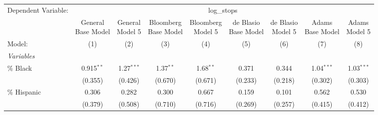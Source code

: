 \begingroup
\centering
\begin{tabular}{lcccccccc}
   \tabularnewline \midrule \midrule
   Dependent Variable: & \multicolumn{8}{c}{log\_stops}\\
                & \makecell{General\\ Base Model}    & \makecell{General\\ Model 5}    & \makecell{Bloomberg\\ Base Model}    & \makecell{Bloomberg\\ Model 5}    & \makecell{de Blasio\\ Base Model}    & \makecell{de Blasio\\ Model 5}    & \makecell{Adams\\ Base Model}    & \makecell{Adams\\ Model 5} \\      
   Model:       & (1)                                & (2)                             & (3)                                  & (4)                               & (5)                                  & (6)                               & (7)                              & (8)\\  
   \midrule
   \emph{Variables}\\
   \% Black     & 0.915$^{**}$                       & 1.27$^{***}$                    & 1.37$^{**}$                          & 1.68$^{**}$                       & 0.371                                & 0.344                             & 1.04$^{***}$                     & 1.03$^{***}$\\   
                & (0.355)                            & (0.426)                         & (0.670)                              & (0.671)                           & (0.233)                              & (0.218)                           & (0.302)                          & (0.303)\\   
   \% Hispanic  & 0.306                              & 0.282                           & 0.300                                & 0.667                             & 0.159                                & 0.101                             & 0.562                            & 0.530\\   
                & (0.379)                            & (0.508)                         & (0.710)                              & (0.716)                           & (0.269)                              & (0.257)                           & (0.415)                          & (0.412)\\   

\end{tabular}
